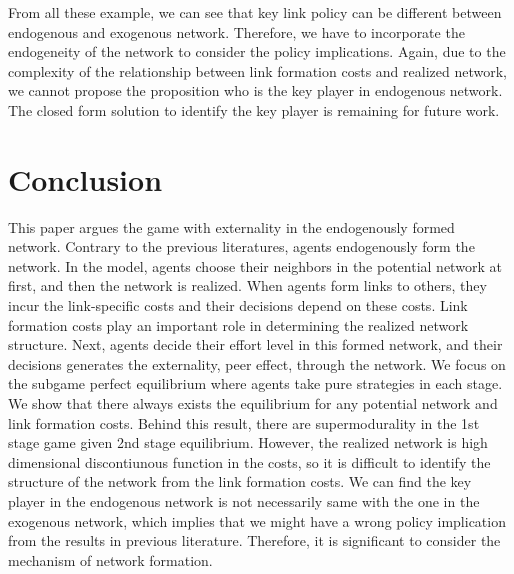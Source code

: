 \documentclass[12pt]{article}
\theoremstyle{definition}
\begin{document}
From all these example, we can see that key link policy can be different between endogenous and exogenous network.
Therefore, we have to incorporate the endogeneity of the network to consider the policy implications.
Again, due to the complexity of the relationship between link formation costs and realized network, we cannot propose the proposition who is the key player in endogenous network.
The closed form solution to identify the key player is remaining for future work.


\section{Conclusion}

This paper argues the game with externality in the endogenously formed network.
Contrary to the previous literatures, agents endogenously form the network.
In the model, agents choose their neighbors in the potential network at first, and then the network is realized.
When agents form links to others, they incur the link-specific costs and their decisions depend on these costs.
Link formation costs play an important role in determining the realized network structure.
Next, agents decide their effort level in this formed network, and their decisions generates the externality, peer effect, through the network.
We focus on the subgame perfect equilibrium where agents take pure strategies in each stage.
We show that there always exists the equilibrium for any potential network and link formation costs.
Behind this result, there are supermodurality in the 1st stage game given 2nd stage equilibrium.
However, the realized network is high dimensional discontiunous function in the costs, so it is difficult to identify the structure of the network from the link formation costs.
We can find the key player in the endogenous network is not necessarily same with the one in the exogenous network, which implies that we might have a wrong policy implication from the results in previous literature.
Therefore, it is significant to consider the mechanism of network formation.
\end{document}
